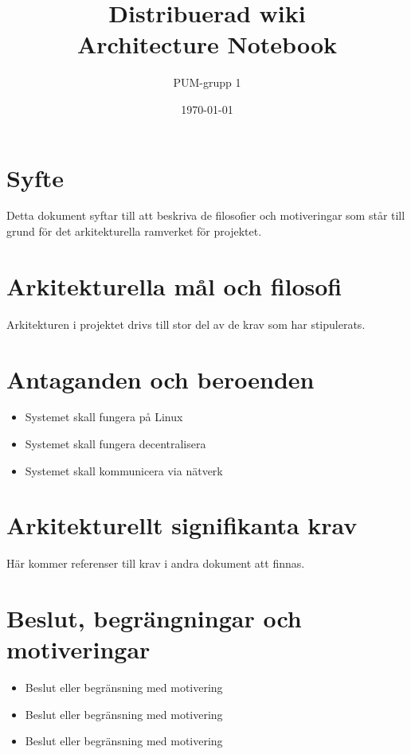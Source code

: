 

\ifpdf
\else
\fi

\title{Distribuerad wiki \\ Architecture Notebook}
\author{PUM-grupp 1}
\date{\today}



\maketitle

\thispagestyle{empty}
\newpage
\section{Syfte}
Detta dokument syftar till att beskriva de filosofier och motiveringar som står till grund för det arkitekturella ramverket för projektet.
\section{Arkitekturella mål och filosofi}
Arkitekturen i projektet drivs till stor del av de krav som har stipulerats.
\section{Antaganden och beroenden}
\begin{itemize}
\item Systemet skall fungera på Linux
\item Systemet skall fungera decentralisera
\item Systemet skall kommunicera via nätverk
\end{itemize}
\section{Arkitekturellt signifikanta krav}
Här kommer referenser till krav i andra dokument att finnas.
\section{Beslut, begrängningar och motiveringar}
\begin{itemize}
\item Beslut eller begränsning med motivering
\item Beslut eller begränsning med motivering
\item Beslut eller begränsning med motivering
\end{itemize}
